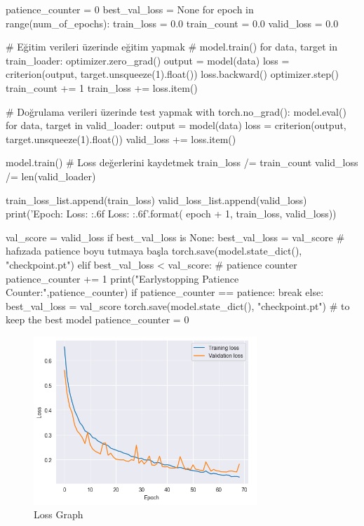\documentclass[11pt]{article}
\begin{document}
\begin{python}
patience_counter = 0
best_val_loss = None
for epoch in range(num_of_epochs):
    train_loss = 0.0
    train_count = 0.0
    valid_loss = 0.0

    # Eğitim verileri üzerinde eğitim yapmak
    # model.train()
    for data, target in train_loader:
        optimizer.zero_grad()
        output = model(data)
        loss = criterion(output, target.unsqueeze(1).float())
        loss.backward()
        optimizer.step()
        train_count += 1
        train_loss += loss.item()

    # Doğrulama verileri üzerinde test yapmak
    with torch.no_grad():
        model.eval()
        for data, target in valid_loader:
            output = model(data)
            loss = criterion(output, target.unsqueeze(1).float())
            valid_loss += loss.item()
    
    model.train()
    # Loss değerlerini kaydetmek
    train_loss /= train_count
    valid_loss /= len(valid_loader)
        
    train_loss_list.append(train_loss)
    valid_loss_list.append(valid_loss)
    print('Epoch: {} \tTraining Loss: {:.6f} \tValidation Loss: {:.6f}'.format(
        epoch + 1, train_loss, valid_loss))
    
    val_score = valid_loss
    if best_val_loss is None:
        best_val_loss = val_score # hafızada patience boyu tutmaya başla
        torch.save(model.state_dict(), "checkpoint.pt")
    elif best_val_loss < val_score: # patience counter
        patience_counter += 1
        print("Earlystopping Patience Counter:",patience_counter)
        if patience_counter == patience:
            break
    else:
        best_val_loss = val_score
        torch.save(model.state_dict(), "checkpoint.pt") # to keep the best model
        patience_counter = 0
\end{python}


\begin{figure}[ht!]
    \centering
    \includegraphics[width=0.75\textwidth]{epochlossgraph.png}
    \caption{Loss Graph}
    \label{fig:my_pic}
\end{figure}
\pagebreak
\end{document}
